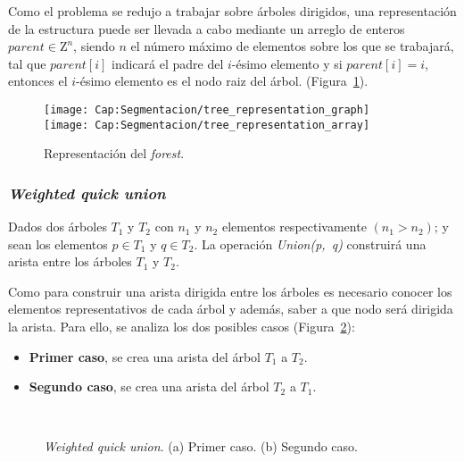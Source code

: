 Como el problema se redujo a trabajar sobre árboles dirigidos, una 
representación de la estructura puede ser llevada a cabo mediante un arreglo
de enteros $parent \in \mathrm{Z}^n$, siendo $n$ el número máximo de elementos
sobre los que se trabajará, tal que $parent[i]$ indicará el padre del 
$i$-ésimo elemento y  si $parent[i] = i$, entonces el $i$-ésimo elemento es el
nodo raiz del árbol. 
(Figura~\ref{fig:cap-segmentacion:forest_representacion}).

\begin{figure}[h!]
  \centering
  \texttt{[image: Cap:Segmentacion/tree\_representation\_graph]}\\
  \texttt{[image: Cap:Segmentacion/tree\_representation\_array]}
	\caption{Representación del \textit{forest}.}
	\label{fig:cap-segmentacion:forest_representacion}
\end{figure}

\subsubsection{\textit{Weighted quick union}}
Dados dos árboles $T_1$ y $T_2$ con $n_1$ y $n_2$ elementos respectivamente 
$(n_1 > n_2)$; y sean los elementos $p \in T_1$ y $q \in T_2$. La operación
\textit{Union(p,~q)} construirá una arista entre los árboles $T_1$ y $T_2$. 

Como para construir una arista dirigida entre los árboles es necesario conocer
los elementos representativos de cada árbol y además, saber a que nodo será
dirigida la arista. Para ello, se analiza los dos posibles casos
(Figura~\ref{fig:cap-segmentacion:UF_weight}):
\begin{itemize}
	\item \textbf{Primer caso}, se crea una arista del árbol $T_1$ a $T_2$.
	\item \textbf{Segundo caso}, se crea una arista del árbol $T_2$ a $T_1$.
\end{itemize}
\begin{figure}[h!]
  \centering
	 { \, \, \, \, }
   \\ 
	\caption[\textit{Weighted quick union}]{\textit{Weighted quick union}. 
	(a) Primer caso. (b) Segundo caso.}
	\label{fig:cap-segmentacion:UF_weight}
\end{figure}

